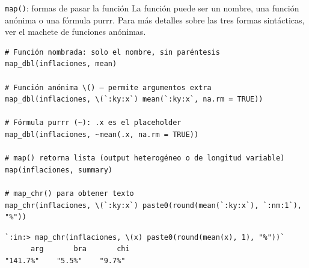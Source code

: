 \documentclass[8pt]{beamer}
\begin{document}
	\begin{frame}[fragile]{\texttt{map()}: formas de pasar la función}
		La función  puede ser un nombre, una función anónima o una fórmula purrr. Para más detalles sobre las tres formas sintácticas, ver el machete de funciones anónimas.

\begin{lstlisting}[style=RScript]
# Función nombrada: solo el nombre, sin paréntesis
map_dbl(inflaciones, mean)

# Función anónima \() — permite argumentos extra
map_dbl(inflaciones, \(`:ky:x`) mean(`:ky:x`, na.rm = TRUE))

# Fórmula purrr (~): .x es el placeholder
map_dbl(inflaciones, ~mean(.x, na.rm = TRUE))

# map() retorna lista (output heterogéneo o de longitud variable)
map(inflaciones, summary)

# map_chr() para obtener texto
map_chr(inflaciones, \(`:ky:x`) paste0(round(mean(`:ky:x`), `:nm:1`), "%"))
\end{lstlisting}
\begin{lstlisting}[style=RConsole]
`:in:> map_chr(inflaciones, \(x) paste0(round(mean(x), 1), "%"))`
      arg       bra       chi
"141.7%"    "5.5%"    "9.7%"
\end{lstlisting}
	\end{frame}
\end{document}
